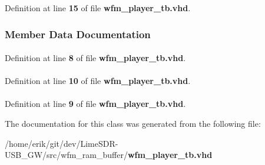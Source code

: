 Definition at line {\bf 15} of file {\bf wfm\+\_\+player\+\_\+tb.\+vhd}.



\subsubsection{Member Data Documentation}
\paragraph[{ieee}]{\hspace{0.3cm}{\ttfamily [Library]}}\label{classwfm__player__tb_a0a6af6eef40212dbaf130d57ce711256}


Definition at line {\bf 8} of file {\bf wfm\+\_\+player\+\_\+tb.\+vhd}.

\paragraph[{numeric\+\_\+std}]{\hspace{0.3cm}{\ttfamily [Package]}}\label{classwfm__player__tb_a2edc34402b573437d5f25fa90ba4013e}


Definition at line {\bf 10} of file {\bf wfm\+\_\+player\+\_\+tb.\+vhd}.

\paragraph[{std\+\_\+logic\+\_\+1164}]{\hspace{0.3cm}{\ttfamily [Package]}}\label{classwfm__player__tb_acd03516902501cd1c7296a98e22c6fcb}


Definition at line {\bf 9} of file {\bf wfm\+\_\+player\+\_\+tb.\+vhd}.



The documentation for this class was generated from the following file\+:\begin{DoxyCompactItemize}
\item 
/home/erik/git/dev/\+Lime\+S\+D\+R-\/\+U\+S\+B\+\_\+\+G\+W/src/wfm\+\_\+ram\+\_\+buffer/{\bf wfm\+\_\+player\+\_\+tb.\+vhd}\end{DoxyCompactItemize}
